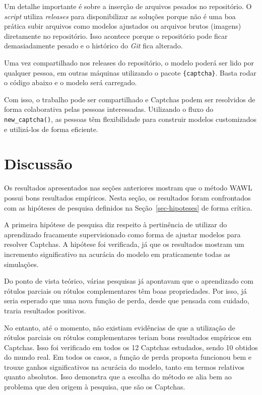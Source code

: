 \documentclass[12pt,twoside,brazilian]{book}
\begin{document}
Um detalhe importante é sobre a inserção de arquivos pesados no
repositório. O \emph{script} utiliza \emph{releases} para disponibilizar
as soluções porque não é uma boa prática subir arquivos como modelos
ajustados ou arquivos brutos (imagens) diretamente no repositório. Isso
acontece porque o repositório pode ficar demasiadamente pesado e o
histórico do \emph{Git} fica alterado.

Uma vez compartilhado nos releases do repositório, o modelo poderá ser
lido por qualquer pessoa, em outras máquinas utilizando o pacote
\texttt{\{captcha\}}. Basta rodar o código abaixo e o modelo será
carregado.

Com isso, o trabalho pode ser compartilhado e Captchas podem ser
resolvidos de forma colaborativa pelas pessoas interessadas. Utilizando
o fluxo do \texttt{new\_captcha()}, as pessoas têm flexibilidade para
construir modelos customizados e utilizá-los de forma eficiente.

\hypertarget{sec-discussao}{%
\section{Discussão}\label{sec-discussao}}

Os resultados apresentados nas seções anteriores mostram que o método
WAWL possui bons resultados empíricos. Nesta seção, os resultados foram
confrontados com as hipóteses de pesquisa definidos na
Seção~\ref{sec-hipoteses} de forma crítica.

A primeira hipótese de pesquisa diz respeito à pertinência de utilizar
do aprendizado fracamente supervisionado como forma de ajustar modelos
para resolver Captchas. A hipótese foi verificada, já que os resultados
mostram um incremento significativo na acurácia do modelo em
praticamente todas as simulações.

Do ponto de vista teórico, várias pesquisas já apontavam que o
aprendizado com rótulos parciais ou rótulos complementares têm boas
propriedades. Por isso, já seria esperado que uma nova função de perda,
desde que pensada com cuidado, traria resultados positivos.

No entanto, até o momento, não existiam evidências de que a utilização
de rótulos parciais ou rótulos complementares teriam bons resultados
empíricos em Captchas. Isso foi verificado em todos os 12 Captchas
estudados, sendo 10 obtidos do mundo real. Em todos os casos, a função
de perda proposta funcionou bem e trouxe ganhos significativos na
acurácia do modelo, tanto em termos relativos quanto absolutos. Isso
demonstra que a escolha do método se alia bem ao problema que deu origem
à pesquisa, que são os Captchas.
\end{document}
